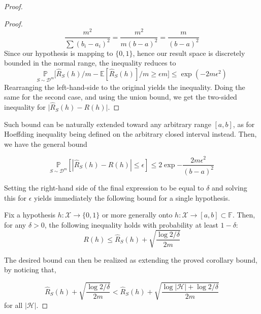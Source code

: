 \begin{proof}
\begin{proof}
\begin{equation*}
        \frac{m^{2}}{\sum (b_{i} - a_{i})^{2}} = \frac{m^{2}}{m(b-a)^{2}} = \frac{m}{(b-a)^{2}}
    \end{equation*}
    Since our hypothesis is mapping to $\{0,1\}$, hence our result space is discretely bounded in the normal range, the inequality reduces to 
    \begin{equation}
        \underset{S\sim \mathcal{D}^{m}}{\mathbb{P}} \Big[ \hat{R}_{S}(h)/m - \mathbb{E}[\hat{R}_{S}(h)]/m \geq \epsilon m \Big] \leq \exp{\left(-2m\epsilon^{2}\right)}
    \end{equation}
    Rearranging the left-hand-side to the original yields the inequality. Doing the same for the second case, and using the union bound, we get the two-sided inequality for $\lvert \hat{R}_{S}(h) - R(h)\rvert$. 
\end{proof}

Such bound can be naturally extended toward any arbitrary range $[a,b]$, as for Hoeffding inequality being defined on the arbitrary closed interval instead. Then, we have the general bound

\begin{equation}
    \underset{S\sim \mathcal{D}^m}{\mathbb{P}} \left[|\hat{R}_S (h) - R(h)| \leq \epsilon\right] \leq 2\exp{-\frac{2m\epsilon^2}{(b-a)^{2}}}
\end{equation}

Setting the right-hand side of the final expression to be equal to $\delta$ and solving this for $\epsilon$ yields immediately the following bound for a single hypothesis. 

\begin{col}
    Fix a hypothesis $h: \mathcal{X}\to \{0,1\}$ or more generally onto $h:\mathcal{X}\to[a,b]\subset\mathbb{F}$. Then, for any $\delta > 0$, the following inequality holds with probability at least $1-\delta$: 
    \begin{equation}
        R(h) \leq \hat{R}_S(h) + \sqrt{\frac{\log{2/\delta}}{2m}}
    \end{equation}
\end{col}

The desired bound can then be realized as extending the proved corollary bound, by noticing that,  

\begin{equation}
        \hat{R}_S(h) + \sqrt{\frac{\log{2/\delta}}{2m}} < \hat{R}_S (h) + \sqrt{\frac{\log{|\mathcal{H}|}+ \log{2/\delta}}{2m}}
    \end{equation}
for all $|\mathcal{H}|$. 
\end{proof}


